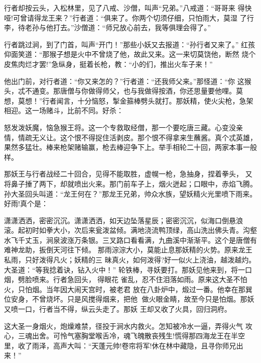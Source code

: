 行者却按云头，入松林里，见了八戒、沙僧，叫声“兄弟。”八戒道：“哥哥来
得快哑!可曾请得龙王来？”行者道：“俱来了。你两个切须仔细，只怕雨大，莫湿
了行李，待老孙与他打去。”沙僧道：“师兄放心前去，我等俱理会得了。”

行者跳过涧，到了门首，叫声“开门！”那些小妖又去报道：“孙行者又来了。”
红孩仰面笑道：“那猴子想是火中不曾烧了他，故此又来。这一来切莫饶他，断然
烧个皮焦肉烂才罢!”急纵身，挺着长枪，教：“小的们，推出火车子来！”

他出门前，对行者道：“你又来怎的？”行者道：“还我师父来。”那怪道：“你
这猴头，忒不通变。那唐僧与你做得师父，也与我做得按酒，你还思量要他哩。莫
想，莫想！”行者闻言，十分恼怒，掣金箍棒劈头就打。那妖精，使火尖枪，急架
相迎。这一场赌斗，比前不同。好杀：

怒发泼妖魔，恼急猴王将。这一个专救取经僧，那一个要吃唐三藏。心变没亲
情，情疏无义让。这个恨不得捉住活剥皮。那个恨不得拿来生蘸酱。真个忒英雄，
果然多猛壮。棒来枪架赌输赢，枪去棒迎争下上。举手相轮二十回，两家本事一般
样。

那妖王与行者战经二十回合，见得不能取胜，虚幌一枪，急抽身，捏着拳头，
又将鼻子捶了两下，却就喷出火来。那门前车子上，烟火迸起；口眼中，赤焰飞腾。
孙大圣回头叫道：“龙王何在？”那龙王兄弟，帅众水族，望妖精火光里喷下雨来。
好雨!真个是：

潇潇洒洒，密密沉沉。潇潇洒洒，如天边坠落星辰；密密沉沉，似海口倒悬浪
滚。起初时如拳大小，次后来瓮泼盆倾。满地浇流鸭顶绿，高山洗出佛头青。沟壑
水飞千丈玉，涧泉波涨万条银。三叉路口看看满，九曲溪中渐渐平。这个是唐僧有
难神龙助，扳倒天河往下倾。
那雨淙淙大小，莫能止息那妖精的火势。原来龙王私雨，只好泼得凡火；妖精的三
昧真火，如何泼得?好一似火上浇油，越泼越灼。大圣道：“等我捻着诀，钻入火中！”
轮铁棒，寻妖要打。那妖见他来到，将一口烟，劈脸喷来。行者急回头，得眼花
雀乱，忍不住泪落如雨。原来这大圣不怕火，只怕烟。当年因大闹天宫时，被老君
放在八卦炉中，煅过一番。他幸在那巽位安身，不曾烧坏。只是风搅得烟来，把他
做火眼金睛，故至今只是怕烟。那妖又喷一口，行者当不得，纵云头走了。那妖
王却又收了火具，回归洞府。

这大圣一身烟火，炮燥难禁，径投于涧水内救火。怎知被冷水一逼，弄得火气
攻心，三魂出舍。可怜气塞胸堂喉舌冷，魂飞魄散丧残生!慌得那四海龙王在半空
里，收了雨泽，高声大叫：“天蓬元帅!卷帘将军!休在林中藏隐，且寻你师兄出来！”

